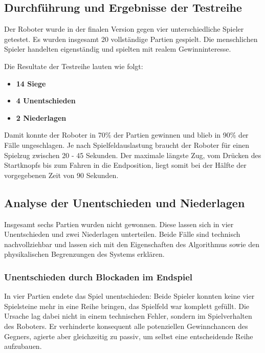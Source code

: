 \subsection{Durchführung und Ergebnisse der Testreihe}

Der Roboter wurde in der finalen Version gegen vier unterschiedliche Spieler getestet. 
Es wurden insgesamt 20 vollständige Partien gespielt. Die menschlichen Spieler handelten eigenständig und spielten mit realem Gewinninteresse.

Die Resultate der Testreihe lauten wie folgt:

\begin{itemize}
	\item \textbf{14 Siege}
	\item \textbf{4 Unentschieden}
	\item \textbf{2 Niederlagen}
\end{itemize}

Damit konnte der Roboter in 70\% der Partien gewinnen und blieb in 90\% der Fälle ungeschlagen. Je nach Spielfeldauslastung braucht der Roboter für einen Spielzug zwischen 20 - 45 Sekunden. Der maximale längste Zug, vom Drücken des Startknopfs bis zum Fahren in die Endposition, liegt somit bei der Hälfte der vorgegebenen Zeit von 90 Sekunden.
\newpage

\subsection{Analyse der Unentschieden und Niederlagen}

Insgesamt sechs Partien wurden nicht gewonnen. Diese lassen sich in vier Unentschieden und zwei Niederlagen unterteilen. Beide Fälle sind technisch nachvollziehbar und lassen sich mit den Eigenschaften des Algorithmus sowie den physikalischen Begrenzungen des Systems erklären.

\subsubsection*{Unentschieden durch Blockaden im Endspiel}

In vier Partien endete das Spiel unentschieden: Beide Spieler konnten keine vier Spielsteine mehr in eine Reihe bringen, das Spielfeld war komplett gefüllt. Die Ursache lag dabei nicht in einem technischen Fehler, sondern im Spielverhalten des Roboters. Er verhinderte konsequent alle potenziellen Gewinnchancen des Gegners, agierte aber gleichzeitig zu passiv, um selbst eine entscheidende Reihe aufzubauen.

